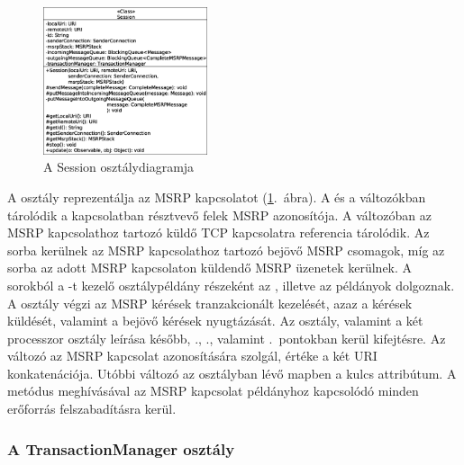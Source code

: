 \begin{figure}
  \vspace{-15pt}
  \begin{center}
    \includegraphics[width=0.43\textwidth]{img/class_diagrams/Session.eps}
  \end{center}
  \vspace{-15pt}
  \captionsetup{font=scriptsize}
  \caption{A Session osztálydiagramja}
   \label{fig:class_session}
  \vspace{-10pt}
\end{figure}
A  osztály reprezentálja az MSRP kapcsolatot (\ref{fig:class_session}.~ábra). A  és a  változókban tárolódik a kapcsolatban résztvevő felek MSRP azonosítója. A  változóban az MSRP kapcsolathoz tartozó küldő TCP kapcsolatra referencia tárolódik. Az  sorba kerülnek az MSRP kapcsolathoz tartozó bejövő MSRP csomagok, míg az  sorba az adott MSRP kapcsolaton küldendő MSRP üzenetek kerülnek. A sorokból a -t kezelő  osztálypéldány részeként az , illetve az  példányok dolgoznak. A  osztály végzi az MSRP kérések tranzakcionált kezelését, azaz a kérések küldését, valamint a bejövő kérések nyugtázását. Az osztály, valamint a két processzor osztály leírása később, ., ., valamint .~pontokban kerül kifejtésre. Az  változó az MSRP kapcsolat azonosítására szolgál, értéke a két URI konkatenációja. Utóbbi változó az  osztályban lévő  mapben a kulcs attribútum. A  metódus meghívásával az MSRP kapcsolat példányhoz kapcsolódó minden erőforrás felszabadításra kerül. 

\subsubsection*{A TransactionManager osztály}
\label{sec:msrp_transactionmanager}

